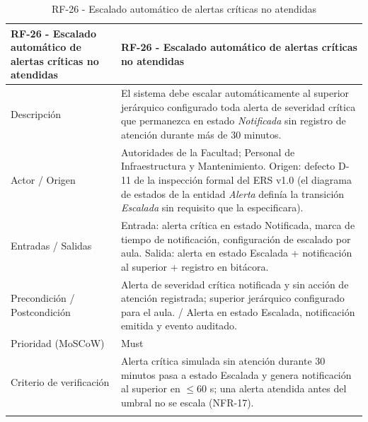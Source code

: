 \begingroup
\small
\begin{longtable}{|p{7.8cm}|p{7.8cm}|}
\hline
RF-26 - Escalado autom\'atico de alertas cr\'iticas no atendidas & RF-26 - Escalado autom\'atico de alertas cr\'iticas no atendidas \\ \hline
Descripci\'on & El sistema debe escalar autom\'aticamente al superior jer\'arquico configurado toda alerta de severidad cr\'itica que permanezca en estado \emph{Notificada} sin registro de atenci\'on durante m\'as de 30 minutos. \\ \hline
Actor / Origen & Autoridades de la Facultad; Personal de Infraestructura y Mantenimiento. Origen: defecto D-11 de la inspecci\'on formal del ERS v1.0 (el diagrama de estados de la entidad \emph{Alerta} defin\'ia la transici\'on \emph{Escalada} sin requisito que la especificara). \\ \hline
Entradas / Salidas & Entrada: alerta cr\'itica en estado Notificada, marca de tiempo de notificaci\'on, configuraci\'on de escalado por aula. Salida: alerta en estado Escalada + notificaci\'on al superior + registro en bit\'acora. \\ \hline
Precondici\'on / Postcondici\'on & Alerta de severidad cr\'itica notificada y sin acci\'on de atenci\'on registrada; superior jer\'arquico configurado para el aula. / Alerta en estado Escalada, notificaci\'on emitida y evento auditado. \\ \hline
Prioridad (MoSCoW) & Must \\ \hline
Criterio de verificaci\'on & Alerta cr\'itica simulada sin atenci\'on durante 30 minutos pasa a estado Escalada y genera notificaci\'on al superior en $\leq$60 s; una alerta atendida antes del umbral no se escala (NFR-17). \\ \hline
\caption{RF-26 - Escalado autom\'atico de alertas cr\'iticas no atendidas}
\end{longtable}
\endgroup

